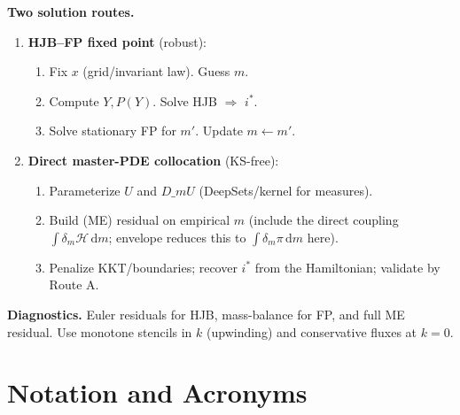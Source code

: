 \documentclass[11pt,letterpaper,oneside]{article}
\numberwithin{equation}{section}
\newcommand{\1}{\mathbf{1}}
\newcommand{\dmU}{D\_m U}
\begin{document}
\begin{tcolorbox}[didacticstyle]
\textbf{Two solution routes.}
\begin{enumerate}[leftmargin=1.25em]
\item[\textbf{A.}] \textbf{HJB--FP fixed point} (robust):
\begin{enumerate}[leftmargin=1em,label*=\arabic*.]
\item Fix $x$ (grid/invariant law). Guess $m$.
\item Compute $Y,P(Y)$. Solve HJB $\Rightarrow$ $i^*$.
\item Solve stationary FP for $m'$. Update $m\leftarrow m'$.
\end{enumerate}
\item[\textbf{B.}] \textbf{Direct master-PDE collocation} (KS-free):
\begin{enumerate}[leftmargin=1em,label*=\arabic*.]
\item Parameterize $U$ and $\dmU$ (DeepSets/kernel for measures).
\item Build (ME) residual on empirical $m$ (include the direct coupling $\int \delta_m \mathcal H\,\mathrm dm$; envelope reduces this to $\int \delta_m \pi\,\mathrm dm$ here).
\item Penalize KKT/boundaries; recover $i^*$ from the Hamiltonian; validate by Route A.
\end{enumerate}
\end{enumerate}

\textbf{Diagnostics.} Euler residuals for HJB, mass-balance for FP, and full ME residual. Use monotone stencils in $k$ (upwinding) and conservative fluxes at $k=0$.
\end{tcolorbox}



\clearpage
\newpage
\section{Notation and Acronyms}\label{sec:notation}
\end{document}
